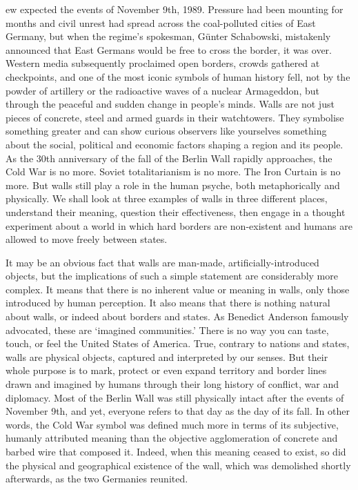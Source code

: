 \label{ch:tear-down-this-wall}

ew expected the events of November 9th, 1989. Pressure had been
   mounting for months and civil unrest had spread across the
   coal-polluted cities of East Germany, but when the regime's spokesman,
   G{\"u}nter Schabowski, mistakenly announced that East Germans would be free
   to cross the border, it was over. Western media subsequently proclaimed
   open borders, crowds gathered at checkpoints, and one of the most
   iconic symbols of human history fell, not by the powder of artillery or
   the radioactive waves of a nuclear Armageddon, but through the peaceful
   and sudden change in people's minds. Walls are not just pieces of
   concrete, steel and armed guards in their watchtowers. They symbolise
   something greater and can show curious observers like yourselves
   something about the social, political and economic factors shaping a
   region and its people. As the 30th anniversary of the fall of the
   Berlin Wall rapidly approaches, the Cold War is no more. Soviet
   totalitarianism is no more. The Iron Curtain is no more. But walls
   still play a role in the human psyche, both metaphorically and
   physically. We shall look at three examples of walls in three different
   places, understand their meaning, question their effectiveness, then
   engage in a thought experiment about a world in which hard borders are
   non-existent and humans are allowed to move freely between states.

   It may be an obvious fact that walls are man-made,
   artificially-introduced objects, but the implications of such a simple
   statement are considerably more complex. It means that there is no
   inherent value or meaning in walls, only those introduced by human
   perception. It also means that there is nothing natural about walls, or
   indeed about borders and states. As Benedict Anderson famously
   advocated, these are `imagined communities.' There is no way you can
   taste, touch, or feel the United States of America. True, contrary to
   nations and states, walls are physical objects, captured and
   interpreted by our senses. But their whole purpose is to mark, protect
   or even expand territory and border lines drawn and imagined by humans
   through their long history of conflict, war and diplomacy. Most of the
   Berlin Wall was still physically intact after the events of November
   9th, and yet, everyone refers to that day as the day of its fall. In
   other words, the Cold War symbol was defined much more in terms of its
   subjective, humanly attributed meaning than the objective agglomeration
   of concrete and barbed wire that composed it. Indeed, when this meaning
   ceased to exist, so did the physical and geographical existence of the
   wall, which was demolished shortly afterwards, as the two Germanies
   reunited.

